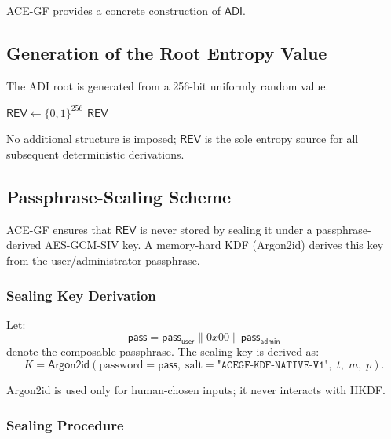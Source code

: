 \documentclass[12pt,a4paper]{article}
\begin{document}
  ACE-GF provides a concrete construction of $\mathsf{ADI}$.

  \subsection{Generation of the Root Entropy Value}

  The ADI root is generated from a 256-bit uniformly random value.

  \begin{algorithm}[h]
   \caption{\textsc{GenerateREV}}
   \begin{center}
  \begin{minipage}{0.9\linewidth}
    \small
    \begin{algorithmic}[1]
     \State $\mathsf{REV} \gets \{0,1\}^{256}$
     \State \Return $\mathsf{REV}$
    \end{algorithmic}
  \end{minipage}
   \end{center}
  \end{algorithm}

  No additional structure is imposed; $\mathsf{REV}$ is the sole entropy source
  for all subsequent deterministic derivations.

  \subsection{Passphrase-Sealing Scheme}

  ACE-GF ensures that $\mathsf{REV}$ is never stored by sealing it under a
  passphrase-derived AES-GCM-SIV key.
  A memory-hard KDF (Argon2id) derives this key from the user/administrator passphrase.

  \subsubsection{Sealing Key Derivation}

  Let:
  \[
   \mathsf{pass} = \mathsf{pass_{user}} \parallel 0x00 \parallel \mathsf{pass_{admin}}
  \]
  denote the composable passphrase.
  The sealing key is derived as:
  \[
   K = \mathsf{Argon2id}(
   \text{password} = \mathsf{pass},\;
   \text{salt} = \texttt{"ACEGF-KDF-NATIVE-V1"},\;
   t,\; m,\; p).
  \]

  Argon2id is used only for human-chosen inputs; it never interacts with HKDF.

  \subsubsection{Sealing Procedure}
\end{document}
